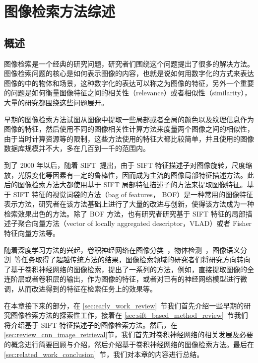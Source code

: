 
\chapter{图像检索方法综述}\label{chapter:overview_related_work}

\section{概述}
图像检索是一个经典的研究问题，研究者们围绕这个问题提出了很多的解决方法。图像检索问题的核心是如何表示图像的内容，也就是说如何用数字化的方式来表达图像的中的物体和场景，这种数字化的表达可以称之为图像的特征，另外一个重要的问题是如何衡量图像特征之间的相关性（relevance）或者相似性（similarity），大量的研究都围绕这些问题展开。

早期的图像检索方法试图从图像中提取一些局部或者全局的颜色以及纹理信息作为图像的特征，然后使用不同的图像相关性计算方法来度量两个图像之间的相似性，由于当时计算资源等的限制，这些方法使用的特征大都比较简单，并且使用的图像数据库规模并不大，多在几百到一千的范围内。

到了 2000 年以后，随着 SIFT~\cite{Lowe1999ObjectRF}提出，由于 SIFT 特征描述子对图像旋转，尺度缩放，光照变化等因素有一定的鲁棒性，因而成为主流的图像局部特征描述方法。此后的图像检索方法大都使用基于 SIFT 局部特征描述子的方法来提取图像特征。基于 SIFT 特征的视觉词袋的方法（bag of features， BOF）是一种常用的图像特征表示方法，研究者在该方法基础上进行了大量的改进与创新，使得该方法成为一种检索效果出色的方法。除了 BOF 方法，也有研究者研究基于 SIFT 特征的局部描述子聚合向量方法（vector of locally aggregated descriptor，VLAD）或者 Fisher 特征向量方法等。

随着深度学习方法的兴起，卷积神经网络在图像分类~\cite{Russakovsky2015ImageNetLS,Simonyan2014VeryDC,Szegedy2015GoingDW,He2016DeepRL}，物体检测~\cite{Liu2016SSDSS,Redmon2016YouOL,Lin2017FocalLF,Ren2017FasterRT}，图像语义分割~\cite{Shelhamer2017FullyCN,Chen2018DeepLabSI,Noh2015LearningDN}等任务取得了超越传统方法的结果，图像检索领域的研究者们将研究方向转向了基于卷积神经网络的图像检索，提出了一系列的方法，例如，直接提取图像的全连阶层或者卷积层的输出，作为图像的特征，或者对已有的神经网络模型进行微调，从而改进得到的特征在检索任务上的效果等。

在本章接下来的部分，在 \ref{sec:early_work_review}~节我们首先介绍一些早期的研究图像检索方法的探索性工作，接着在 \ref{sec:sift_based_method_review}~节我们将介绍基于 SIFT 特征描述子的图像检索方法。然后，在 \ref{sec:review_cnn_image_retrieval}节，我们首先对卷积神经网络的相关发展及必要的概念进行简要回顾与介绍，然后介绍基于卷积神经网络的图像检索方法。最后在 \ref{sec:related_work_conclusion}~节，我们对本章的内容进行总结。

